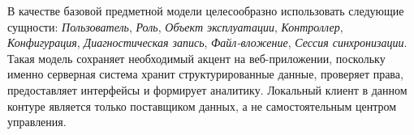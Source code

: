 В качестве базовой предметной модели целесообразно использовать следующие
сущности: \textit{Пользователь}, \textit{Роль}, \textit{Объект эксплуатации},
\textit{Контроллер}, \textit{Конфигурация}, \textit{Диагностическая запись},
\textit{Файл-вложение}, \textit{Сессия синхронизации}. Такая модель сохраняет
необходимый акцент на веб-приложении, поскольку именно серверная система хранит
структурированные данные, проверяет права, предоставляет интерфейсы и формирует
аналитику. Локальный клиент в данном контуре является только поставщиком данных,
а не самостоятельным центром управления.
